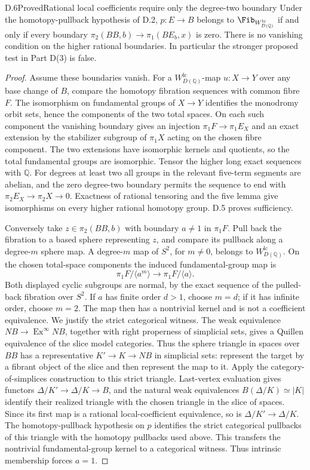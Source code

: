\begin{claim}{D.6}{Proved}{Rational local coefficients require only the degree-two boundary}
Under the homotopy-pullback hypothesis of D.2, $p:E\to B$ belongs to $\Fib_{W_{D(\mathbb Q)}^{\mathrm{lc}}}$ if and only if every boundary $\pi_2(BB,b)\to\pi_1(BE_b,x)$ is zero. There is no vanishing condition on the higher rational boundaries. In particular the stronger proposed test in Part D(3) is false.
\end{claim}
\begin{proof}
Assume these boundaries vanish. For a $W_{D(\mathbb Q)}^{\mathrm{lc}}$-map $u:X\to Y$ over any base change of $B$, compare the homotopy fibration sequences with common fibre $F$. The isomorphism on fundamental groups of $X\to Y$ identifies the monodromy orbit sets, hence the components of the two total spaces. On each such component the vanishing boundary gives an injection $\pi_1F\to\pi_1E_X$ and an exact extension by the stabilizer subgroup of $\pi_1X$ acting on the chosen fibre component. The two extensions have isomorphic kernels and quotients, so the total fundamental groups are isomorphic. Tensor the higher long exact sequences with $\mathbb Q$. For degrees at least two all groups in the relevant five-term segments are abelian, and the zero degree-two boundary permits the sequence to end with $\pi_2E_X\to\pi_2X\to0$. Exactness of rational tensoring and the five lemma give isomorphisms on every higher rational homotopy group. D.5 proves sufficiency.

Conversely take $z\in\pi_2(BB,b)$ with boundary $a\ne1$ in $\pi_1F$. Pull back the fibration to a based sphere representing $z$, and compare its pullback along a degree-$m$ sphere map. A degree-$m$ map of $S^2$, for $m\ne0$, belongs to $W_{D(\mathbb Q)}^{\mathrm{lc}}$. On the chosen total-space components the induced fundamental-group map is
\[
 \pi_1F/\langle a^m\rangle\longrightarrow\pi_1F/\langle a\rangle.
\]
Both displayed cyclic subgroups are normal, by the exact sequence of the pulled-back fibration over $S^2$. If $a$ has finite order $d>1$, choose $m=d$; if it has infinite order, choose $m=2$. The map then has a nontrivial kernel and is not a coefficient equivalence. We justify the strict categorical witness. The weak equivalence $NB\to\operatorname{Ex}^{\infty}NB$, together with right properness of simplicial sets, gives a Quillen equivalence of the slice model categories. Thus the sphere triangle in spaces over $BB$ has a representative $K'\to K\to NB$ in simplicial sets: represent the target by a fibrant object of the slice and then represent the map to it. Apply the category-of-simplices construction to this strict triangle. Last-vertex evaluation gives functors $\Delta/K'\to\Delta/K\to B$, and the natural weak equivalences $B(\Delta/K)\simeq|K|$ identify their realized triangle with the chosen triangle in the slice of spaces. Since its first map is a rational local-coefficient equivalence, so is $\Delta/K'\to\Delta/K$. The homotopy-pullback hypothesis on $p$ identifies the strict categorical pullbacks of this triangle with the homotopy pullbacks used above. This transfers the nontrivial fundamental-group kernel to a categorical witness. Thus intrinsic membership forces $a=1$.


\end{proof}
